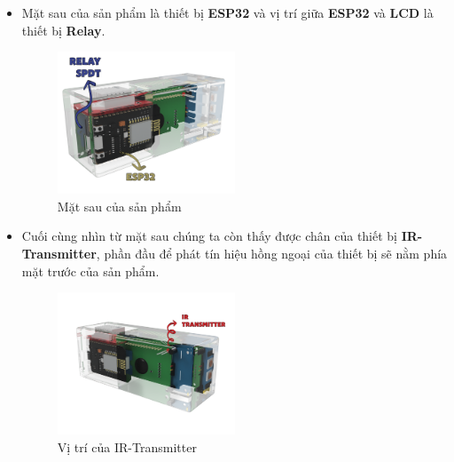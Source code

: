 \documentclass{report}
\begin{document}
\begin{itemize}
    \pagebreak
    \item Mặt sau của sản phẩm là thiết bị \textbf{ESP32} và vị trí giữa \textbf{ESP32} và \textbf{LCD} là thiết bị \textbf{Relay}.
    \begin{figure}[!ht]
        \centering
        \includegraphics[width=0.5\textwidth, keepaspectratio]{img/3-01.png}
        \caption{Mặt sau của sản phẩm}
    \end{figure}
    
    \item Cuối cùng nhìn từ mặt sau chúng ta còn thấy được chân của thiết bị  \textbf{IR-Transmitter}, phần đầu để phát tín hiệu hồng ngoại của thiết bị sẽ nằm phía mặt trước của sản phẩm.
    \begin{figure}[H]
        \includegraphics[width=0.5\textwidth, keepaspectratio]{img/4-01.png}
        \centering
        \caption{Vị trí của IR-Transmitter}
    \end{figure}

    
\end{itemize}

\newpage
\end{document}
